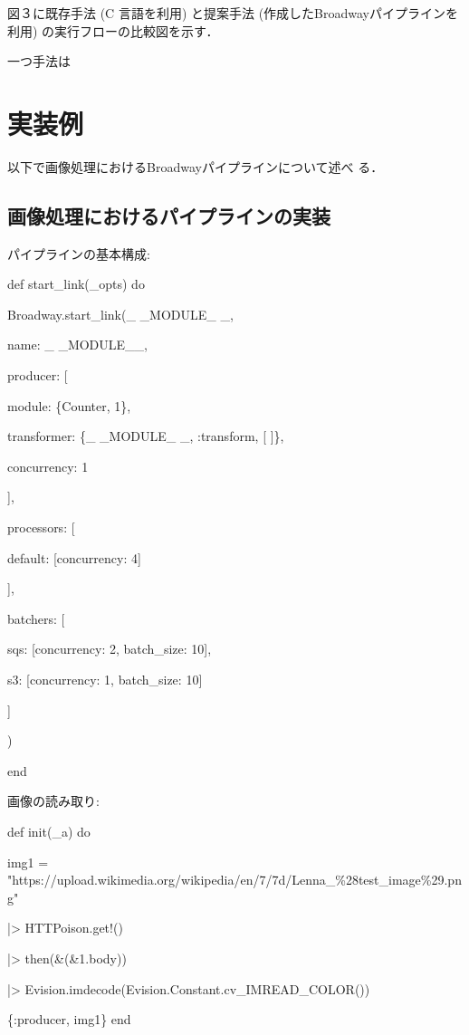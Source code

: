 \documentclass[a4paper]{jreport}	%
\begin{document}
図３に既存手法 (C 言語を利用) と提案手法 (作成したBroadwayパイプラインを利用) の実行フローの比較図を示す．

一つ手法は


\section{実装例}
以下で画像処理におけるBroadwayパイプラインについて述べ
る．
\subsection{画像処理におけるパイプラインの実装}
パイプラインの基本構成:

def start\_link(\_opts) do

    Broadway.start\_link(\_ \_MODULE\_ \_,
    
      name: \_ \_MODULE\_\_,
      
      producer: [
      
        module: \{Counter, 1\},
        
        transformer: \{\_ \_MODULE\_ \_, :transform, [ ]\},
        
        concurrency: 1
        
       ],
       
      processors: [
      
        default: [concurrency: 4]
        
      ],
      
        batchers: [
        
        sqs: [concurrency: 2, batch\_size: 10],
        
        s3: [concurrency: 1, batch\_size: 10]
        
      ]
      
    )
    
end

画像の読み取り:

def init(\_a) do

    img1 = 
      "https://upload.wikimedia.org/wikipedia/en/7/7d/Lenna\_\%28test\_image\%29.png"
      
  |> HTTPoison.get!()
  
  |> then(\&(\&1.body))
  
  |> Evision.imdecode(Evision.Constant.cv\_IMREAD\_COLOR()) 
  
  \{:producer, img1\}
end
\end{document}
